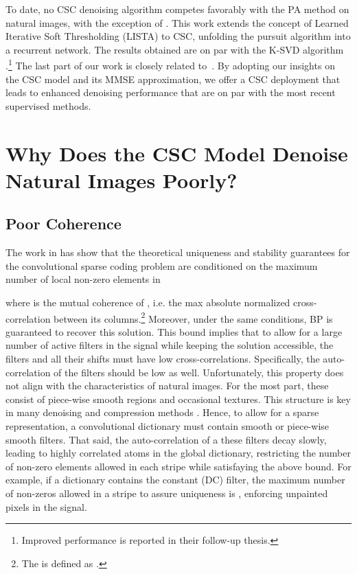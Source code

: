 \documentclass{article}
\begin{document}
To date, no CSC denoising algorithm competes favorably with the PA method on natural images, with the exception of \cite{sreter2018learned}. This work extends the concept of Learned Iterative Soft Thresholding (LISTA) \cite{gregor2010learning,rolfe2013discriminative,wang2015deep} to CSC, unfolding the pursuit algorithm into a recurrent network. The results obtained are on par with the K-SVD algorithm \cite{elad2006image}.\footnote{Improved performance is reported in their follow-up thesis.} The last part of our work is closely related to~\cite{sreter2018learned}. By adopting our insights on the CSC model and its MMSE approximation, we offer a CSC deployment that leads to enhanced denoising performance that are on par with the most recent supervised methods.



\section{Why Does the CSC Model Denoise Natural Images Poorly?}
\label{sec:whyCsc}

\subsection{Poor Coherence}
The work in \cite{papyan2017working} has show that the theoretical uniqueness and stability guarantees for the convolutional sparse coding problem are conditioned on the maximum number of local non-zero elements in  

where  is the mutual coherence of , i.e. the max absolute normalized cross-correlation between its columns.\footnote{The  is defined as 
.}
Moreover, under the same conditions, BP is guaranteed to recover this solution. This bound implies that to allow for a large number of active filters in the signal while keeping the solution accessible, the filters and all their shifts must have low cross-correlations. Specifically, the auto-correlation of the filters should be low as well. Unfortunately, this property does not align with the characteristics of natural images. For the most part, these consist of piece-wise smooth regions and occasional textures. This structure is key in many denoising and compression methods \cite{rudin1992nonlinear,lewis1992image}. Hence, to allow for a sparse representation, a convolutional dictionary must contain smooth or piece-wise smooth filters. That said, the auto-correlation of a these filters decay slowly, leading to highly correlated atoms in the global dictionary, restricting the number of non-zero elements allowed in each stripe  while satisfaying the above bound. For example, if a dictionary contains the constant (DC) filter, the maximum number of non-zeros allowed in a stripe to assure uniqueness is , enforcing unpainted pixels in the signal. 
\end{document}
